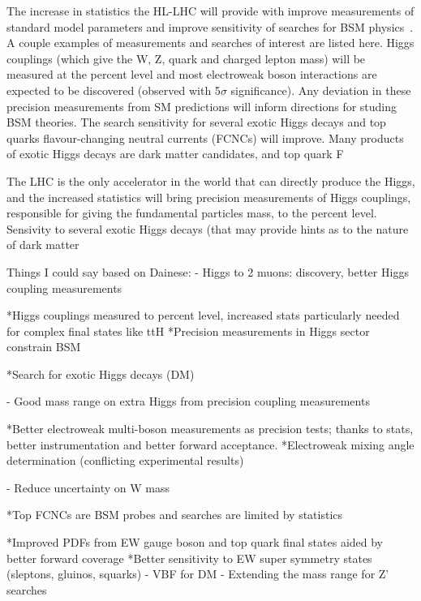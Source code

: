The increase in statistics the HL-LHC will provide with improve measurements of standard model parameters and improve sensitivity of searches for BSM physics~\cite{dainese_physics_2018}. A couple examples of measurements and searches of interest are listed here. Higgs couplings (which give the W, Z, quark and charged lepton mass) will be measured at the percent level and most electroweak boson interactions are expected to be discovered (observed with 5$\sigma$ significance). Any deviation in these precision measurements from SM predictions will inform directions for studing BSM theories. The search sensitivity for several exotic Higgs decays and top quarks flavour-changing neutral currents (FCNCs) will improve. Many products of exotic Higgs decays are dark matter candidates, and top quark F

The LHC is the only accelerator in the world that can directly produce the Higgs, and the increased statistics will bring precision measurements of Higgs couplings, responsible for giving the fundamental particles mass, to the percent level. Sensivity to several exotic Higgs decays (that may provide hints as to the nature of dark matter

Things I could say based on Dainese:
- Higgs to 2 muons: discovery, better Higgs coupling measurements

*Higgs couplings measured to percent level, increased stats particularly needed for complex final states like ttH
*Precision measurements in Higgs sector constrain BSM

*Search for exotic Higgs decays (DM)

- Good mass range on extra Higgs from precision coupling measurements

*Better electroweak multi-boson measurements as precision tests; thanks to stats, better instrumentation and better forward acceptance.
*Electroweak mixing angle determination (conflicting experimental results)

- Reduce uncertainty on W mass

*Top FCNCs are BSM probes and searches are limited by statistics

*Improved PDFs from EW gauge boson and top quark final states aided by better forward coverage
*Better sensitivity to EW super symmetry states (sleptons, gluinos, squarks)
- VBF for DM
- Extending the mass range for Z' searches



